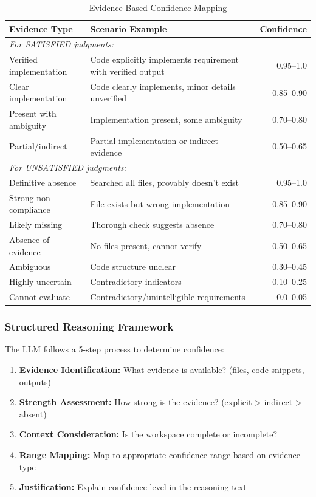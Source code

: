 \documentclass[11pt,a4paper]{article}
\begin{document}
\begin{table}[H]
\centering
\caption{Evidence-Based Confidence Mapping}
\begin{tabularx}{\textwidth}{lXr}
\toprule
\textbf{Evidence Type} & \textbf{Scenario Example} & \textbf{Confidence} \\
\midrule
\multicolumn{3}{l}{\textit{For SATISFIED judgments:}} \\
Verified implementation & Code explicitly implements requirement with verified output & 0.95--1.0 \\
Clear implementation & Code clearly implements, minor details unverified & 0.85--0.90 \\
Present with ambiguity & Implementation present, some ambiguity & 0.70--0.80 \\
Partial/indirect & Partial implementation or indirect evidence & 0.50--0.65 \\
\midrule
\multicolumn{3}{l}{\textit{For UNSATISFIED judgments:}} \\
Definitive absence & Searched all files, provably doesn't exist & 0.95--1.0 \\
Strong non-compliance & File exists but wrong implementation & 0.85--0.90 \\
Likely missing & Thorough check suggests absence & 0.70--0.80 \\
Absence of evidence & No files present, cannot verify & 0.50--0.65 \\
Ambiguous & Code structure unclear & 0.30--0.45 \\
Highly uncertain & Contradictory indicators & 0.10--0.25 \\
Cannot evaluate & Contradictory/unintelligible requirements & 0.0--0.05 \\
\bottomrule
\end{tabularx}
\label{tab:evidence-mapping}
\end{table}

\subsubsection{Structured Reasoning Framework}

The LLM follows a 5-step process to determine confidence:

\begin{enumerate}[leftmargin=*]
    \item \textbf{Evidence Identification:} What evidence is available? (files, code snippets, outputs)
    \item \textbf{Strength Assessment:} How strong is the evidence? (explicit > indirect > absent)
    \item \textbf{Context Consideration:} Is the workspace complete or incomplete?
    \item \textbf{Range Mapping:} Map to appropriate confidence range based on evidence type
    \item \textbf{Justification:} Explain confidence level in the reasoning text
\end{enumerate}
\end{document}
